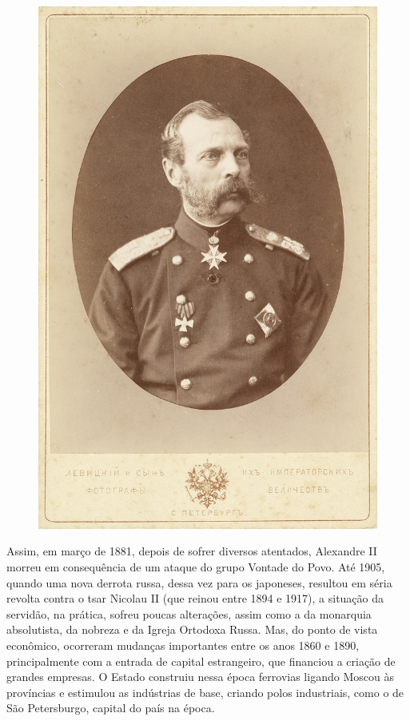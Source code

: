 \documentclass{article}
\begin{document}
\begin{figure}[ht!]
\includegraphics[width=\textwidth]{./images/PNLD0049-06.png}
\end{figure}

Assim, em março de 1881, depois de sofrer diversos atentados, Alexandre
II morreu em consequência de um ataque do grupo Vontade do Povo. Até
1905, quando uma nova derrota russa, dessa vez para os japoneses,
resultou em séria revolta contra o tsar Nicolau II (que reinou entre
1894 e 1917), a situação da servidão, na prática, sofreu poucas
alterações, assim como a da monarquia absolutista, da nobreza e da
Igreja Ortodoxa Russa. Mas, do ponto de vista econômico, ocorreram
mudanças importantes entre os anos 1860 e 1890, principalmente com a
entrada de capital estrangeiro, que financiou a criação de grandes
empresas. O Estado construiu nessa época ferrovias ligando Moscou às
províncias e estimulou as indústrias de base, criando polos industriais,
como o de São Petersburgo, capital do país na época.
\end{document}

